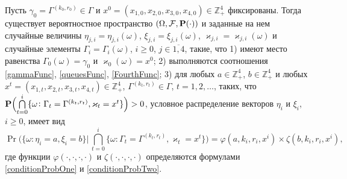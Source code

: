 \documentclass{report}
\begin{document}
\begin{theorem}
Пусть $\gamma_0=\Gamma^{(k_0,r_0)}\in \Gamma$ и $x^0=(x_{1,0},x_{2,0}, x_{3,0},x_{4,0})\in \mathbb{Z}_+^4$ фиксированы.
Тогда существует вероятностное пространство $(\Omega, {\cal F}, \Pr(\cdot))$ и заданные на нем случайные величины $\eta_{j,i}=\eta_{j,i}(\omega)$, $\xi_{j,i}=\xi_{j,i}(\omega)$, 	 $\varkappa_{j,i}=\varkappa_{j,i}(\omega)$ и случайные элементы $\Gamma_i=\Gamma_i(\omega)$, $i\geqslant 0$, $j\in \overline{1,4}$, такие, что 1) имеют место равенства $\Gamma_0(\omega) = \gamma_0$ и $\varkappa_0(\omega)=x^0$; 2) выполняются соотношения \eqref{gammaFunc}, \eqref{queuesFunc}, \eqref{FourthFunc}; 3) для любых  $a\in \mathbb{Z}_+^4$, $b\in \mathbb{Z}_+^4$ и любых $x^t=(x_{1,t},x_{2,t},x_{3,t},x_{4,t}) \in \mathbb{Z}_+^4$, $\Gamma^{(k_t,r_t)} \in \Gamma$, $t = 1, 2, \ldots$, таких, что $\Pr\Bigl(\bigcap\limits_{t=0}^{i}\{\omega\colon \Gamma_t=\Gamma^{(k_t,r_t)}, \varkappa_t=x^t\}\Bigr)>0$, условное распределение векторов $\eta_i$ и $\xi_i$, $i \geqslant 0$,  имеет вид
\begin{equation}
\Pr \biggl(\{ \omega \colon \eta_i = a, \xi_i=b\} \bigg
|\,\bigcap_{t=0}^{i}\{\omega\colon \Gamma_t=\Gamma^{(k_t,r_t)}, \varkappa_t=x^t\}\biggr)=
\varphi(a,k_i,r_i,x^i)\times \zeta(b,k_i,r_i,x^i),
\label{ProbablititiesToProve}
\end{equation}
где функции $\varphi(\cdot, \cdot, \cdot, \cdot)$ и $\zeta(\cdot, \cdot, \cdot, \cdot)$ определяются формулами \eqref{conditionProbOne} и \eqref{conditionProbTwo}.

\label{myTheorem}
\end{theorem}
\end{document}
